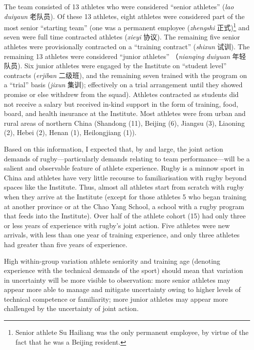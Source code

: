 \begin{CJK}{UTF8}{gbsn}
The team consisted of 13 athletes who were considered ``senior athletes'' (\textit{lao duiyaun} 老队员).  Of these 13 athletes, eight athletes were considered part of the most senior ``starting team''
(one was a permanent employee (\textit{zhengshi} 正式)\footnote{Senior athlete Su Hailiang was the only permanent employee, by virtue of the fact that he was a Beijing resident.} and seven were full time contracted athletes (\textit{xieyi} 协议). The remaining five senior athletes were provisionally contracted on a ``training contract'' (\textit{shixun} 试训).  The remaining 13 athletes were considered ``junior athletes'' （\textit{nianqing duiyuan} 年轻队员). Six junior athletes were engaged by the Institute on ``student level'' contracts (\textit{erjiban} 二级班), and the remaining seven trained with the program on a ``trial'' basis (\textit{jixun} 集训); effectively on a trial arrangement until they showed promise or else withdrew from the squad).  Athletes contracted as students did not receive a salary but received in-kind support in the form of training, food, board, and health insurance at the Institute.  Most athletes were from urban and rural areas of northern China (Shandong (11), Beijing (6), Jiangsu (3), Liaoning (2), Hebei (2), Henan (1), Heilongjiang (1)).


Based on this information, I expected that, by and large, the joint action demands of rugby---particularly demands relating to team performance---will be a salient and observable feature of athlete experience.  Rugby is a minnow sport in China and athletes have very little recourse to familiarisation with rugby beyond spaces like the Institute. Thus, almost all athletes start from scratch with rugby when they arrive at the Institute (except for those athletes 5 who began training at another province or at the Chao Yang School, a school with a rugby program that feeds into the Institute).  Over half of the athlete cohort (15) had only three or less years of experience with rugby's joint action.  Five athletes were new arrivals, with less than one year of training experience, and only three athletes had greater than five years of experience.

High within-group variation athlete seniority and training age (denoting experience with the technical demands of the sport) should mean that variation in uncertainty will be more visible to observation: more senior athletes may appear more able to manage and mitigate uncertainty owing to higher levels of technical competence or familiarity; more junior athletes may appear more challenged by the uncertainty of joint action.


\end{CJK}
